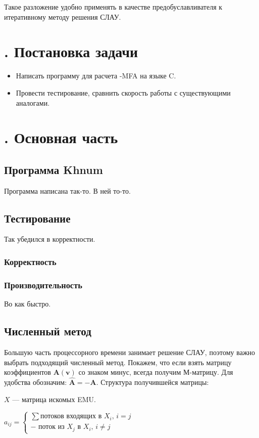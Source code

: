 \documentclass[14pt, a4paper]{extreport}
\newcommand{\CC}{C\nolinebreak\hspace{-.05em}\raisebox{.4ex}{\tiny\bf +}\nolinebreak\hspace{-.10em}\raisebox{.4ex}{\tiny\bf +}}
\def\CC{{C\nolinebreak[4]\hspace{-.05em}\raisebox{.4ex}{\tiny\bf ++}}} %
\begin{document}
Такое разложение удобно применять в качестве предобуславливателя к итеративному методу решения СЛАУ.


\chapter[Постановка задачи]{\thechapter{}. Постановка задачи}
\begin{itemize}
	\item Написать программу для расчета -MFA на языке \CC.
	\item Провести тестирование, сравнить скорость работы с существующими аналогами.
\end{itemize}

\chapter[Основная часть]{\thechapter{}. Основная часть}
\section{Программа Khnum}
Программа написана так-то. В ней то-то. 

\section{Тестирование}
Так убедился в корректности.

\subsection{Корректность}

\subsection{Производительность}
Во как быстро.

\clearpage
\section{Численный метод}
Большую часть процессорного времени занимает решение СЛАУ, поэтому важно выбрать подходящий численный метод. Покажем, что если взять матрицу коэффициентов $\mathbf{A}(\mathbf{v})$ со знаком минус, всегда получим М-матрицу. Для удобства обозначим: $\hat{\mathbf{A}} = -\mathbf{A}$. Структура получившейся матрицы:

$X$ --- матрица искомых EMU.

$a_{ij} = 
\begin{cases} 
\text{$\sum$потоков входящих в $X_i$, $i=j$}\\
\text{$-$ поток из $X_j$ в $X_i$, $i\neq{}j$}
\end{cases}
$
\end{document}
